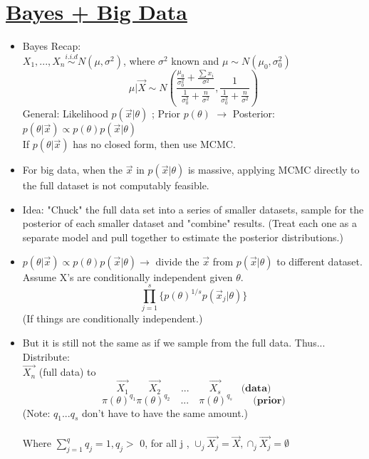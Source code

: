 \documentclass[11pt, oneside]{article}   	%
\begin{document}
\section{\underline{Bayes + Big Data}}
\begin{itemize}
\item Bayes Recap:\\
$X_1, ... , X_n \stackrel{i.i.d}{\sim} N(\mu, \sigma^2)$, where $\sigma^2$ known and $\mu \sim N(\mu_0, \sigma_0^2)$\\
\[
\mu| \vec{X} \sim N(\frac{\frac{\mu_0}{\sigma_0^2}+\frac{\sum x_i}{\sigma^2}}{\frac{1}{\sigma_0^2}+\frac{n}{\sigma^2}}, \frac{1}{\frac{1}{{\sigma_0^2}}+{\frac{n}{\sigma^2}}})
\]
General: Likelihood $p(\vec{x}|\theta)$ ; \qquad  Prior $p(\theta)$
$\rightarrow$ Posterior: $p(\theta|\vec{x}) \propto p(\theta)p(\vec{x}|\theta)$\\
If $p(\theta|\vec{x})$ has no closed form, then use MCMC. 
\item For big data, when the $ \vec{x} $ in  $p(\vec{x}|\theta)$ is massive, applying MCMC directly to the full dataset is not computably feasible. \\
\item Idea: "Chuck" the full data set into a series of smaller datasets, sample for the posterior of each smaller dataset and "combine" results. (Treat each one as a separate model and pull together to estimate the posterior distributions.) \\
\item $p(\theta|\vec{x}) \propto p(\theta)p(\vec{x}|\theta) \rightarrow$ divide the $\vec{x}$ from $p(\vec{x}|\theta)$ to different dataset. \\
Assume X's are conditionally independent given $\theta$. \\
\[
\prod_{j=1}^{s} \{p(\theta)^{1/s}p(\vec{x}_j|\theta)\} 
\]
(If things are conditionally independent.)\\
\item But it is still not the same as if we sample from the full data. Thus...\\
Distribute:\\
$\vec{X_n}$ (full data) to \\
\[
\vec{X_1} \qquad \vec{X_2} \qquad ... \qquad \vec{X_s}  \qquad  \textbf{(data)}
\]
\[
\pi(\theta)^{q_1} \pi(\theta)^{q_2} \quad... \quad \pi(\theta)^{q_s} \qquad \textbf{(prior)}
\]
(Note: ${q_1}... {q_s} $ don't have to have the same amount.) \\
\\
Where $\sum_{j=1}^{q} q_j=1, q_j >$ 0, for all j , $\cup_{j} \vec{X_j} = \vec{X}, \cap_{j} \vec{X_j} = \emptyset$\\

\end{itemize}
\end{document}
